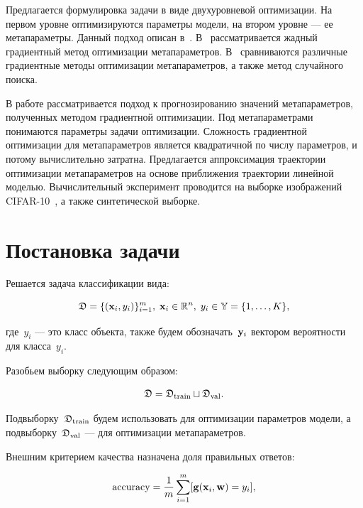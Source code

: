 \documentclass[12pt, twoside]{article}
\begin{document}
Предлагается формулировка задачи в виде двухуровневой оптимизации. На первом уровне оптимизируются параметры модели, на втором уровне --- ее метапараметры. Данный подход описан в~\cite{journals/corr/LuketinaBR15, journals/anor/BakhteevS20, journals/corr/MaclaurinDA15}. В~\cite{journals/corr/LuketinaBR15} рассматривается жадный градиентный метод оптимизации метапараметров. В~\cite{journals/anor/BakhteevS20} сравниваются различные градиентные методы оптимизации метапараметров, а также метод случайного поиска.

В работе рассматривается подход к прогнозированию значений метапараметров, полученных методом градиентной оптимизации. Под метапараметрами понимаются параметры задачи оптимизации. Сложность градиентной оптимизации для метапараметров является квадратичной по числу параметров, и потому вычислительно затратна. Предлагается аппроксимация траектории оптимизации метапараметров на основе приближения траектории линейной моделью. Вычислительный эксперимент проводится на выборке изображений CIFAR-10~\cite{krizhevsky2009learning}, а также синтетической выборке.

\section{Постановка задачи}
Решается задача классификации вида:

\begin{equation} \label{eq:data}
    \fD = \{(\bx_i, y_i)\}_{i=1}^{m},\; \bx_i \in \bbR^n,\; y_i \in \bbY = \{1, \dots, K\},
\end{equation}

\noindent
где~$y_i$ — это класс объекта, также будем обозначать~$\mathbf{y}_i$ вектором вероятности для
класса~$y_i$.

Разобьем выборку следующим образом:

\begin{equation} \label{eq:split}
    \fD = \fD_\text{train} \sqcup \fD_\text{val}.
\end{equation}

Подвыборку~$\mathfrak{D}_\text{train}$ будем использовать для оптимизации параметров модели, а подвыборку~$\mathfrak{D}_\text{val}$ --- для оптимизации метапараметров.

Внешним критерием качества назначена доля правильных ответов:

\begin{equation} \label{eq:accuracy}
    \text{accuracy} = \frac{1}{m}\sum\limits_{i=1}^m [\bg(\bx_i, \bw) = y_i],
\end{equation}
\end{document}
